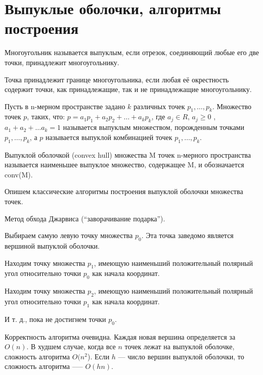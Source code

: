 \section{Выпуклые оболочки, алгоритмы построения}
\begin{define}
  Многоугольник называется выпуклым, если отрезок, соединяющий любые
  его две точки, принадлежит многоугольнику.
\end{define}
\begin{define}
  Точка принадлежит границе многоугольника, если любая её окрестность
  содержит точки, как принадлежащие, так и не принадлежащие
  многоугольнику.
\end{define}
\begin{define}
  Пусть в n-мерном пространстве задано $k$ различных точек $p_1, \ldots, p_k$.
  Множество точек $p$, таких, что: $p = a_1p_1 + a_2p_2 + \ldots +
  a_kp_k$, где $a_j \in R$,
  $a_j \ge 0$ , $a_1 + a_2 + \ldots a_k = 1$ называется выпуклым множеством,
  порожденным точками $p_1, \ldots, p_k$, а $p$ называется выпуклой комбинацией
  точек $p_1, \ldots, p_k$.
\end{define}
\begin{define}
  Выпуклой оболочкой (convex hull) множества M точек n-мерного
  пространства называется наименьшее выпуклое множество, содержащее M,
  и обозначается conv(M).
\end{define}

Опишем классические алгоритмы построения выпуклой оболочки множества
точек.

\begin{algorithm}{Метод обхода Джарвиса (``заворачивание подарка'').}
\item Выбираем самую левую точку множества $p_0$. Эта точка заведомо
  является вершиной выпуклой оболочки.
\item Находим точку множества $p_1$, имеющую наименьший положительный
  полярный угол относительно точки $p_0$ как начала координат.
\item Находим точку множества $p_2$, имеющую наименьший положительный
  полярный угол относительно точки $p_1$ как начала координат.
\item И т. д., пока не достигнем точки $p_0$.
\end{algorithm}

Корректность алгоритма очевидна. Каждая новая вершина определяется за
$O(n)$. В худшем случае, когда все $n$ точек лежат на выпуклой оболочке,
сложность алгоритма $O(n^2$). Если $h$ --- число вершин выпуклой оболочки, то
сложность алгоритма --— $O(hn)$.

